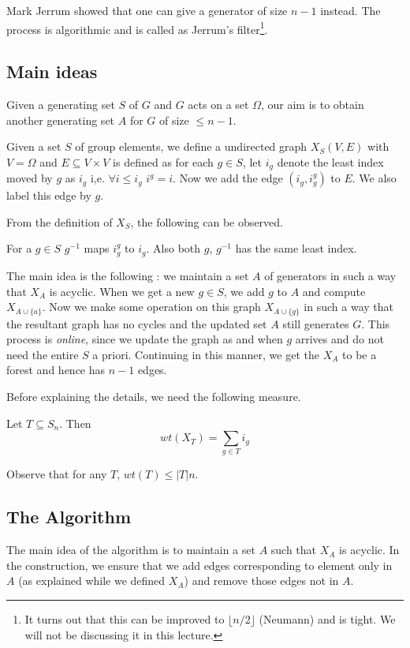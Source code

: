 Mark Jerrum showed that one can give a generator of size $n-1$ instead. The
process is algorithmic and is called as Jerrum's filter\footnote{It turns out that this can be improved to $\lfloor n/2 \rfloor$ (Neumann) and is tight.  We will not be discussing it in this lecture.}.

\subsection{Main ideas}
Given a generating set $S$ of $G$ and $G$ acts on a set $\Omega$, our aim is 
to obtain another generating set $A$ for $G$ of size $\le n-1$.

Given a set $S$ of group elements, we define a undirected graph $X_S(V,E)$ with
$V= \Omega$ and $E \subseteq V \times V$ is defined as for each $g \in S$, let
$i_g$ denote the least index moved by $g$ as $i_g$ i,e.  $\forall i \le i_g$
$i^g = i$.  Now we add the edge $(i_g,i_g^g)$ to $E$. We also 
label this edge by $g$. 

From the definition of $X_S$, the following can be observed.
\begin{observation}
	For a $g \in S$ $g^{-1}$ maps $i_g^g$ to $i_g$. Also 
	both $g$, $g^{-1}$ has the same least index. 
\end{observation}
The main idea is the following : we maintain a set $A$ of generators in such a
way that $X_A$ is acyclic. When we get a new $g \in S$, we add $g$ to $A$ and
compute $X_{A \cup \{a\}}$. Now we make some operation on this graph 
$X_{A \cup \{g\}}$ in such a way that the resultant graph has no cycles and
the updated set $A$ still generates $G$. This process is \emph{online},
since we update the graph as and when $g$ arrives and do not need the entire
$S$ a priori. Continuing in this manner, we get the $X_A$ to be a forest and
hence has $n-1$ edges.

Before explaining the details, we need the following measure.
\begin{definition}[Weight of $T$]
	Let $T \subseteq S_n$. Then \[ wt(X_T )=\sum_{g \in T} i_g \]
\end{definition}
Observe that for any $T$, $wt(T) \le |T|n$.

\subsection{The Algorithm}
The main idea of the algorithm is to maintain a set $A$ such that $X_A$ is
acyclic. In the construction, we ensure that we add edges
corresponding to element only in $A$ (as explained while we defined $X_A$) 
and remove those edges not in $A$.

